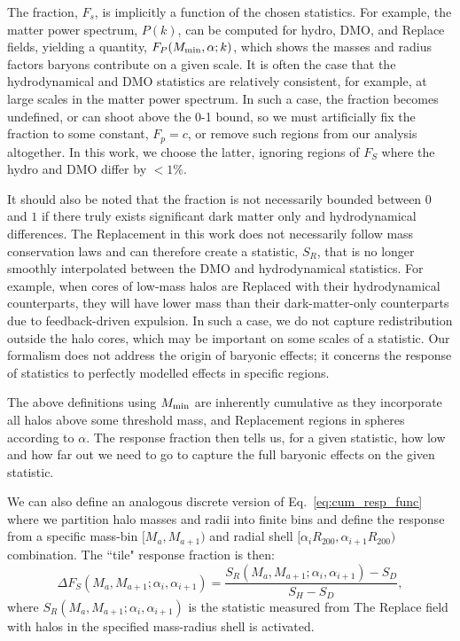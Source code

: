 \documentclass[linenumbers,trackchanges]{aastex701}
\begin{document}
The fraction, $F_s$, is implicitly a function of the chosen statistics. For example, the matter power spectrum, $P(k)$, can be computed for hydro, DMO, and Replace fields, yielding a quantity, $F_P(M_{\rm min}, \alpha; k)$, which shows the masses and radius factors baryons contribute on a given scale. It is often the case that the hydrodynamical and DMO statistics are relatively consistent, for example, at large scales in the matter power spectrum. In such a case, the fraction becomes undefined, or can shoot above the 0-1 bound, so we must artificially fix the fraction to some constant, $F_p = c$, or remove such regions from our analysis altogether. In this work, we choose the latter, ignoring regions of $F_S$ where the hydro and DMO differ by $<1\%$.

It should also be noted that the fraction is not necessarily bounded between $0$ and $1$ if there truly exists significant dark matter only and hydrodynamical differences. The Replacement in this work does not necessarily follow mass conservation laws and can therefore create a statistic, $S_R$, that is no longer smoothly interpolated between the DMO and hydrodynamical statistics. For example, when cores of low-mass halos are Replaced with their hydrodynamical counterparts, they will have lower mass than their dark-matter-only counterparts due to feedback-driven expulsion. In such a case, we do not capture redistribution outside the halo cores, which may be important on some scales of a statistic. Our formalism does not address the origin of baryonic effects; it concerns the response of statistics to perfectly modelled effects in specific regions.

The above definitions using $M_{\rm min}$ are inherently cumulative as they incorporate all halos above some threshold mass, and Replacement regions in spheres according to $\alpha$. The response fraction then tells us, for a given statistic, how low and how far out we need to go to capture the full baryonic effects on the given statistic.

We can also define an analogous discrete version of Eq.~\ref{eq:cum_resp_func} where we partition halo masses and radii into finite bins and define the response from a specific mass-bin $[M_a, M_{a+1})$ and radial shell $[\alpha_i R_{200}, \alpha_{i+1} R_{200})$ combination. The ``tile" response fraction is then:
\begin{equation}\label{eq:disc_resp_func}
\Delta F_S(M_a, M_{a+1}; \alpha_i, \alpha_{i+1}) =
\dfrac{S_R(M_a, M_{a+1}; \alpha_i, \alpha_{i+1}) - S_D}{S_H-S_D},
\end{equation}
where $S_R(M_a, M_{a+1}; \alpha_i, \alpha_{i+1})$ is the statistic measured from
The Replace field with halos in the specified mass-radius shell is activated.
\end{document}
